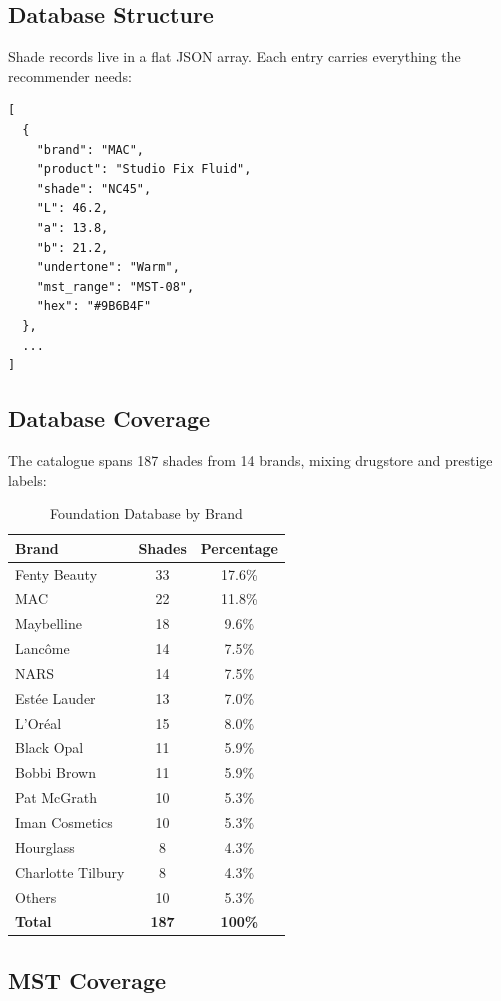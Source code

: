 \subsection{Database Structure}

Shade records live in a flat JSON array. Each entry carries everything the recommender needs:

\begin{verbatim}
[
  {
    "brand": "MAC",
    "product": "Studio Fix Fluid",
    "shade": "NC45",
    "L": 46.2,
    "a": 13.8,
    "b": 21.2,
    "undertone": "Warm",
    "mst_range": "MST-08",
    "hex": "#9B6B4F"
  },
  ...
]
\end{verbatim}

\subsection{Database Coverage}

The catalogue spans 187 shades from 14 brands, mixing drugstore and prestige labels:

\begin{table}[h]
\centering
\small
\begin{tabular}{|l|c|c|}
\hline
\textbf{Brand} & \textbf{Shades} & \textbf{Percentage} \\
\hline
Fenty Beauty & 33 & 17.6\% \\
MAC & 22 & 11.8\% \\
Maybelline & 18 & 9.6\% \\
Lancôme & 14 & 7.5\% \\
NARS & 14 & 7.5\% \\
Estée Lauder & 13 & 7.0\% \\
L'Oréal & 15 & 8.0\% \\
Black Opal & 11 & 5.9\% \\
Bobbi Brown & 11 & 5.9\% \\
Pat McGrath & 10 & 5.3\% \\
Iman Cosmetics & 10 & 5.3\% \\
Hourglass & 8 & 4.3\% \\
Charlotte Tilbury & 8 & 4.3\% \\
Others & 10 & 5.3\% \\
\hline
\textbf{Total} & \textbf{187} & \textbf{100\%} \\
\hline
\end{tabular}
\caption{Foundation Database by Brand}
\end{table}

\subsection{MST Coverage}

